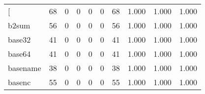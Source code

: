 \begin{longtable}{lp{1.3cm}p{1.3cm}p{1.3cm}p{1.3cm}p{1.3cm}p{1.3cm}p{1.3cm}p{1.3cm}p{1.3cm}}
\bottomrule
\endlastfoot
{[}         &                     68 &                                             0 &                                            0 &                                           0 &                                            0 &                                         68 &                                1.000 &                                  1.000 &                                1.000 \\
b2sum     &                     56 &                                             0 &                                            0 &                                           0 &                                            0 &                                         56 &                                1.000 &                                  1.000 &                                1.000 \\
base32    &                     41 &                                             0 &                                            0 &                                           0 &                                            0 &                                         41 &                                1.000 &                                  1.000 &                                1.000 \\
base64    &                     41 &                                             0 &                                            0 &                                           0 &                                            0 &                                         41 &                                1.000 &                                  1.000 &                                1.000 \\
basename  &                     38 &                                             0 &                                            0 &                                           0 &                                            0 &                                         38 &                                1.000 &                                  1.000 &                                1.000 \\
basenc    &                     55 &                                             0 &                                            0 &                                           0 &                                            0 &                                         55 &                                1.000 &                                  1.000 &                                1.000 \\

\end{longtable}
